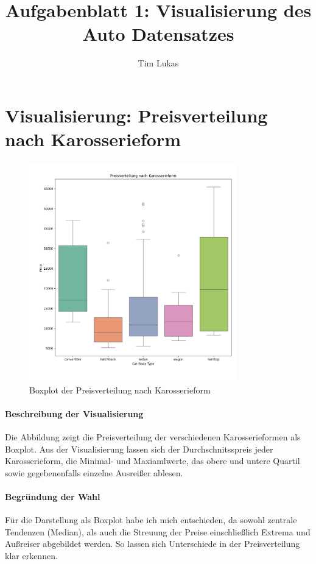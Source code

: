 \documentclass[a4paper,12pt]{article}
\title{Aufgabenblatt 1: Visualisierung des Auto Datensatzes}
\author{Tim Lukas}
\begin{document}
\maketitle

\section{Visualisierung: Preisverteilung nach Karosserieform}
\begin{figure}[H]
    \centering
    \includegraphics[width=0.8\textwidth]{../images/preisverteilung_nach_karrosserie.png} %
    \caption{Boxplot der Preisverteilung nach Karosserieform}
    \label{fig:vis1}
\end{figure}

\paragraph{Beschreibung der Visualisierung} \break
Die Abbildung zeigt die Preisverteilung der verschiedenen Karosserieformen als Boxplot.
Aus der Visualisierung lassen sich der Durchschnitsspreis jeder Karosserieform, die Minimal- und Maxiamlwerte, das
obere und untere Quartil sowie gegebenenfalls einzelne Ausreißer ablesen.

\paragraph{Begründung der Wahl}
Für die Darstellung als Boxplot habe ich mich entschieden, da sowohl zentrale Tendenzen (Median), als auch die Streuung der
Preise einschließlich Extrema und Außreiser abgebildet werden. So lassen sich Unterschiede in der Preisverteilung klar erkennen.
\end{document}
